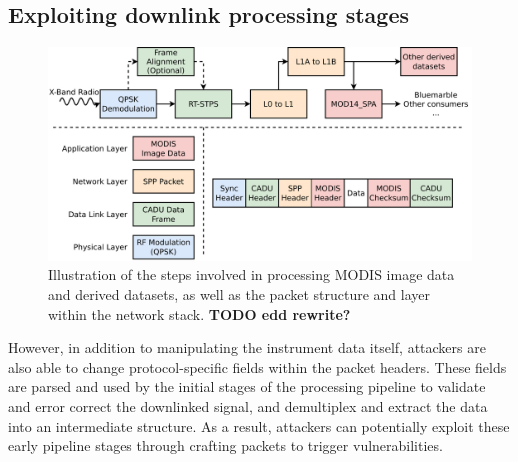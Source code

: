 


\subsection{Exploiting downlink processing stages}

\begin{figure}
    \centering
    \includegraphics[width=\linewidth]{diagrams/attack_types.pdf}
    \caption{Illustration of the steps involved in processing MODIS image data and derived datasets, as well as the packet structure and layer within the network stack. \textbf{TODO edd rewrite?}}
    \label{fig:attack_types}
\end{figure}



However, in addition to manipulating the instrument data itself, attackers are also able to change protocol-specific fields within the packet headers.
These fields are parsed and used by the initial stages of the processing pipeline to validate and error correct the downlinked signal, and demultiplex and extract the data into an intermediate structure.
As a result, attackers can potentially exploit these early pipeline stages through crafting packets to trigger vulnerabilities.

